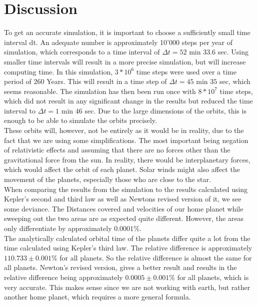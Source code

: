 \documentclass[reprint,english,notitlepage]{revtex4-2}
\begin{document}
\section{Discussion}
To get an accurate simulation, it is important to choose a sufficiently small time interval dt.
An adequate number is approximately 10'000 steps per year of simulation, which corresponds to a time interval of $\Delta t = 52$ min $33.6$ sec.
Using smaller time intervals will result in a more precise simulation, but will increase computing time. In this simulation, $3*10^6$ time steps were used over a time period of $260$ Years.
This will result in a time step of $\Delta t = 45$ min $35$ sec, which seems reasonable.
The simulation has then been run once with $8*10^7$ time steps, which did not result in any significant change in the results but reduced the time interval to $\Delta t = 1$ min $46$ sec.
Due to the large dimensions of the orbits, this is enough to be able to simulate the orbits precisely.\\
These orbits will, however, not be entirely as it would be in reality, due to the fact that we are using some simplifications.
The most important being negation of relativistic effects and assuming that there are no forces other than the gravitational force from the sun.
In reality, there would be interplanetary forces, which would affect the orbit of each planet.
Solar winds might also affect the movement of the planets, especially those who are close to the star.\\
When comparing the results from the simulation to the results calculated using Kepler's second and third law as well as Newtons revised version of it, we see some deviance.
The Distances covered and velocities of our home planet while sweeping out the two areas are as expected quite different.
However, the areas only differentiate by approximately $0.0001\%$.\\

The analytically calculated orbital time of the planets differ quite a lot from the time calculated using Kepler's third law.
The relative difference is approximately $110.733 \pm 0.001\%$ for all planets.
So the relative difference is almost the same for all planets.
Newton's revised version, gives a better result and results in the relative difference being approximately $0.0005 \pm 0.001\%$ for all planets, which is very accurate.
This makes sense since we are not working with earth, but rather another home planet, which requires a more general formula.
\end{document}
